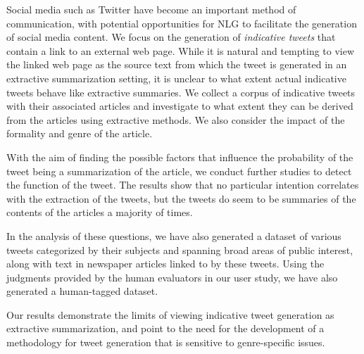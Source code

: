 Social media such as Twitter have become an important method of communication, with potential opportunities for NLG to facilitate the generation of social media content. We focus on the generation of \emph{indicative tweets} that contain a link to an external web page. While it is natural and tempting to view the linked web page as the source text from which the tweet is generated in an extractive summarization setting, it is unclear to what extent actual indicative tweets behave like extractive summaries. We collect a corpus of indicative tweets with their associated articles and investigate to what extent they can be derived from the articles using extractive methods. We also consider the impact of the formality and genre of the article.

With the aim of finding the possible factors that influence the probability of the tweet being a summarization of the article, we conduct further studies to detect the function of the tweet. The results show that no particular intention correlates with the extraction of the tweets, but the tweets do seem to be summaries of the contents of the articles a majority of times. 

In the analysis of these questions, we have also generated a dataset of various tweets categorized by their subjects and  spanning broad areas of public interest, along with text in newspaper articles linked to by these tweets. Using the judgments provided by the human evaluators in our user study, we have also generated a human-tagged dataset.

Our results demonstrate the limits of viewing indicative tweet generation as extractive summarization, and point to the need for the development of a methodology for tweet generation that is sensitive to genre-specific issues.